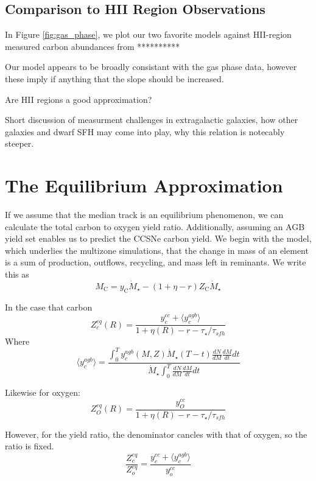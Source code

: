 \documentclass[fleqn,usenatbib]{mnras}
\begin{document}
\subsection{Comparison to HII Region Observations}
In Figure \ref{fig:gas_phase}, we plot our two favorite models against HII-region measured carbon abundances from **********

Our model appears to be broadly consistant with the gas phase data, however these imply if anything that the slope should be increased. 

Are HII regions a good approximation?

Short discussion of measurment challenges in extragalactic galaxies, how other galaxies and dwarf SFH may come into play, why this relation is notecably steeper.

\section{The Equilibrium Approximation}\label{equilibrium}
If we assume that the median track is an equilibrium phenomenon, we can calculate the total carbon to oxygen yield ratio. Additionally, assuming an AGB yield set enables us to predict the CCSNe carbon yield.  
We begin with the model, which underlies the multizone simulations, that the change in mass of an element is a sum of production, outflows, recycling, and mass left in reminants. We write this as
\begin{equation}
M_\text{C} = y_\text{C} \dot{M}_\star - (1 + \eta - r) Z_\text{C} \dot{M}_\star
\end{equation}

In the case that carbon
\begin{equation}
Z_c^{eq}(R) = \frac{y_c^{cc} + \langle y_c^{agb} \rangle }{1 + \eta(R) - r - \tau_\star / \tau_{sfh}}
\end{equation}Where
\begin{equation}
\langle y_c^{agb} \rangle = \frac{\int_0^T y_c^{agb}(M, Z) \dot{M}_\star(T - t) \frac{dN}{dM} \frac{dM}{dt} dt  }{ \dot{M}_\star \int_0^T \frac{dN}{dM} \frac{dM}{dt} dt}
\end{equation}

Likewise for oxygen:
\begin{equation}
Z_O^{eq}(R) = \frac{y_O^{cc}}{1 + \eta(R) - r - \tau_\star / \tau_{sfh}}
\end{equation}

However, for the yield ratio, the denominator cancles with that of oxygen, so the ratio is fixed.
\begin{equation}
\frac{Z_c^{eq}}{Z_o^{eq}} = \frac{y_c^{cc} + \langle y_c^{agb} \rangle }{y_o^{cc}}
\end{equation}
\end{document}

